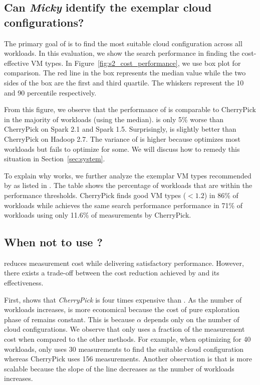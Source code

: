 \subsection{Can \emph{Micky} identify the exemplar cloud configurations?}

The primary goal of \micky is to find the most suitable cloud configuration across all workloads.
In this evaluation, we show the search performance in finding the cost-effective VM types.
In Figure~\ref{fig:s2_cost_performance}, we use box plot for comparison.
The red line in the box represents the median value while the two sides of the box are the first and third quartile.
The whiskers represent the 10 and 90 percentile respectively.

From this figure, we observe that the performance of \micky is comparable to CherryPick in the majority of workloads (using the median).
\micky is only 5\% worse than CherryPick on Spark 2.1 and Spark 1.5.
Surprisingly, \micky is slightly better than CherryPick on Hadoop 2.7.
The variance of \micky is higher because \micky
optimizes most workloads but fails to optimize for some.
We will discuss how to remedy this situation in Section~\ref{sec:system}.

To explain why \micky works, we further analyze the exemplar VM types recommended by \micky as listed in \mytable{\ref{table:top3}}.
The table shows the percentage of workloads that are within the performance thresholds.
CherryPick finds good VM types ($< 1.2$) in 86\% of workloads while
\micky achieves the same search performance performance in 71\% of workloads using only 11.6\% of measurements by CherryPick.

% 


\subsection{When not to use \micky?}
\label{sec:kneepoint}

\micky reduces measurement cost while delivering satisfactory performance.
However, there exists a trade-off between the cost reduction achieved by \micky and its effectiveness.

First, \myfigure{\ref{fig:cost_saving}} shows that \emph{CherryPick} is four times expensive than \micky. As the number of workloads increases, \micky is more economical because
the cost of pure exploration phase of \micky remains constant. This is because $\alpha$ depends only on the number of cloud configurations.
We observe that \micky only uses a fraction of the measurement cost when compared to the other methods.
For example, when optimizing for 40 workloads, \micky only uses 30 measurements to find the suitable cloud configuration whereas CherryPick uses 156 measurements.
Another observation is that \micky is more scalable because the slope of the line decreases as the number of workloads increases.

